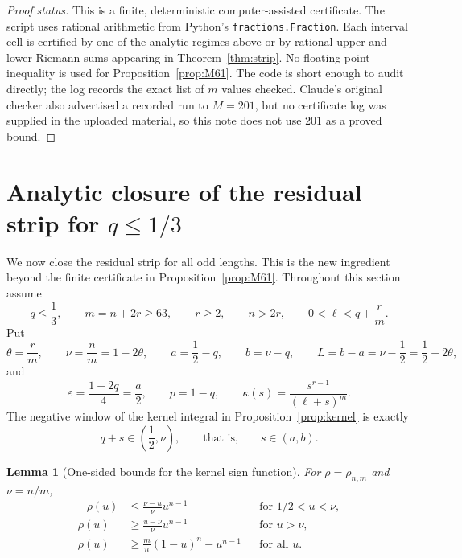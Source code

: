 \documentclass[11pt]{article}
\newtheorem{lemma}[theorem]{Lemma}
\begin{document}
\begin{proof}[Proof status]
This is a finite, deterministic computer-assisted certificate.  The script uses rational arithmetic from Python's \texttt{fractions.Fraction}.  Each interval cell is certified by one of the analytic regimes above or by rational upper and lower Riemann sums appearing in Theorem~\ref{thm:strip}.  No floating-point inequality is used for Proposition~\ref{prop:M61}.  The code is short enough to audit directly; the log records the exact list of $m$ values checked.  Claude's original checker also advertised a recorded run to $M=201$, but no certificate log was supplied in the uploaded material, so this note does not use $201$ as a proved bound.
\end{proof}



\section{Analytic closure of the residual strip for $q\le 1/3$}\label{sec:analytic-strip}

We now close the residual strip for all odd lengths.  This is the new ingredient beyond the finite certificate in Proposition~\ref{prop:M61}.  Throughout this section assume
\begin{equation}\label{eq:residual-tail}
        q\le\frac13,\qquad m=n+2r\ge63,\qquad r\ge2,\qquad n>2r,
        \qquad 0<\ell<q+\frac rm.
\end{equation}
Put
\[
        \theta=\frac rm,
        \qquad \nu=\frac nm=1-2\theta,
        \qquad a=\frac12-q,
        \qquad b=\nu-q,
        \qquad L=b-a=\nu-\frac12=\frac12-2\theta,
\]
and
\[
        \varepsilon=\frac{1-2q}{4}=\frac a2,
        \qquad p=1-q,
        \qquad \kappa(s)=\frac{s^{r-1}}{(\ell+s)^m}.
\]
The negative window of the kernel integral in Proposition~\ref{prop:kernel} is exactly
\[
        q+s\in\left(\frac12,\nu\right),
        \qquad\text{that is,}\qquad s\in(a,b).
\]

\begin{lemma}[One-sided bounds for the kernel sign function]\label{lem:rho-one-sided}
For $\rho=\rho_{n,m}$ and $\nu=n/m$,
\begin{align}
        -\rho(u)&\le \frac{\nu-u}{\nu}u^{n-1}
        &&\text{for }1/2<u<\nu,\label{eq:rho-neg-tail}\\
        \rho(u)&\ge \frac{u-\nu}{\nu}u^{n-1}
        &&\text{for }u>\nu,\label{eq:rho-pos-tail}\\
        \rho(u)&\ge \frac mn(1-u)^n-u^{n-1}
        &&\text{for all }u.\label{eq:rho-left-surplus}
\end{align}
\end{lemma}
\end{document}
